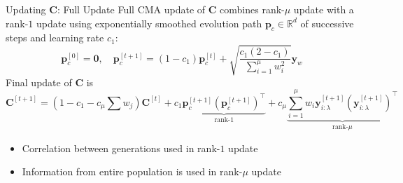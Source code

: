 \documentclass[11pt,compress,t,notes=noshow, xcolor=table]{beamer}
\begin{document}
%
%

\begin{vbframe}{Updating $\bm{C}$: Full Update}
Full CMA update of $\bm{C}$ combines rank-$\mu$ update with a rank-$1$ update using exponentially smoothed evolution path $\bm{p}_c \in \mathbb{R}^{d}$ of successive steps and learning rate $c_1$:
$$\bm{p}_{c}^{[0]}=\bm{0}, \quad \bm{p}_{c}^{[t+1]} = (1-c_1)\bm{p}_{c}^{[t]} + \sqrt{\frac{c_1(2-c_1)}{\sum_{i=1}^{\mu}w_i^2}}\bm{y}_w$$
Final update of $\bm{C}$ is
$$\bm{C}^{[t+1]}=(1-c_1-c_{\mu}{\scriptstyle\sum} w_j)\bm{C}^{[t]}+c_1 \underbrace{\bm{p}_{c}^{[t+1]}(\bm{p}_{c}^{[t+1]})^{\top}}_{\text{rank-$1$}}+c_{\mu}\underbrace{\sum_{i=1}^{\mu}w_i \bm{y}_{i:\lambda}^{[t+1]}(\bm{y}_{i:\lambda}^{[t+1]})^{\top}}_{\text{rank-$\mu$}}$$
\vspace{-0.4cm}
\begin{itemize}
    \item Correlation between generations used in rank-$1$ update
    \item Information from entire population is used in rank-$\mu$ update
\end{itemize}
\end{vbframe}

\end{document}
